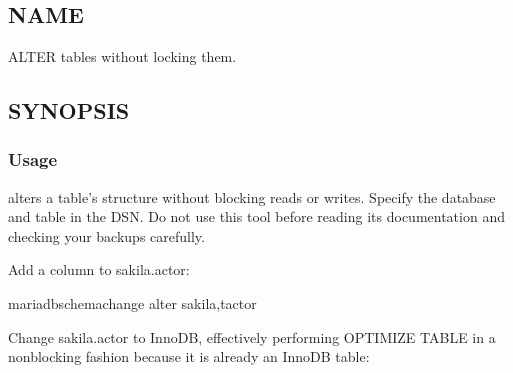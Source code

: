 \documentclass[letterpaper,10pt,english]{sphinxmanual}
\begin{document}
\chapter{}
\label{\detokenize{mariadb-schema-change:mariadb-schema-change}}\label{\detokenize{mariadb-schema-change::doc}}

\section{NAME}
\label{\detokenize{mariadb-schema-change:name}}
 \sphinxhyphen{} ALTER tables without locking them.


\section{SYNOPSIS}
\label{\detokenize{mariadb-schema-change:synopsis}}

\subsection{Usage}
\label{\detokenize{mariadb-schema-change:usage}}
\begin{sphinxVerbatim}[commandchars=\\\{\}]
 \PYG{p}{[}\PYG{p}{]} 
\end{sphinxVerbatim}

 alters a table’s structure without blocking reads or
writes.  Specify the database and table in the DSN. Do not use this tool before
reading its documentation and checking your backups carefully.

Add a column to sakila.actor:

\begin{sphinxVerbatim}[commandchars=\\\{\}]
mariadb\PYGZhy{}schema\PYGZhy{}change \PYGZhy{}\PYGZhy{}alter  sakila,tactor
\end{sphinxVerbatim}

Change sakila.actor to InnoDB, effectively performing OPTIMIZE TABLE in a
non\sphinxhyphen{}blocking fashion because it is already an InnoDB table:
\end{document}
